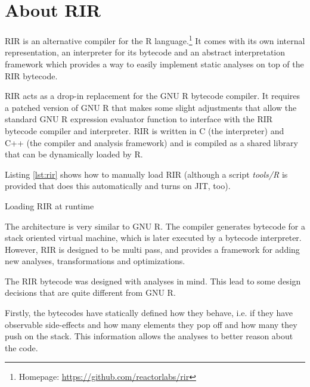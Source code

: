 \chapter{About RIR\label{rir}}

RIR is an alternative compiler for the R language.\footnote{Homepage: \url{https://github.com/reactorlabs/rir}} It comes with its own internal representation, an interpreter for its bytecode and an abstract interpretation framework which provides a way to easily implement static analyses on top of the RIR bytecode.

RIR acts as a drop-in replacement for the GNU R bytecode compiler. It requires a patched version of GNU R that makes some slight adjustments that allow the standard GNU R expression evaluator function to interface with the RIR bytecode compiler and interpreter. RIR is written in C (the interpreter) and C++ (the compiler and analysis framework) and is compiled as a shared library that can be dynamically loaded by R.


Listing \ref{lst:rir} shows how to manually load RIR (although a script \emph{tools/R} is provided that does this automatically and turns on JIT, too).

\begin{listing}[htbp]
  \caption{\label{lst:rir}Loading RIR at runtime}
  \begin{rcode}
> dyn.load("~/rir/build/librir.so")  # path to the shared object
> source("~/rir/rir/R/rir.R")  # load the API for RIR compiler
> # RIR is now ready:
> f <- rir.compile(function() {})
> f
function() {}
<bytecode: 0x34b4510>
> rir.disassemble(f)
0x2f80538
   guard_fun_  { == 0x2077cd8
   push_  23 # NULL
   ret_ 
  \end{rcode}
\end{listing}

The architecture is very similar to GNU R. The compiler generates bytecode for a stack oriented virtual machine, which is later executed by a bytecode interpreter. However, RIR is designed to be multi pass, and provides a framework for adding new analyses, transformations and optimizations.

The RIR bytecode was designed with analyses in mind. This lead to some design decisions that are quite different from GNU R.

Firstly, the bytecodes have statically defined how they behave, i.e. if they have observable side-effects and how many elements they pop off and how many they push on the stack. This information allows the analyses to better reason about the code.

